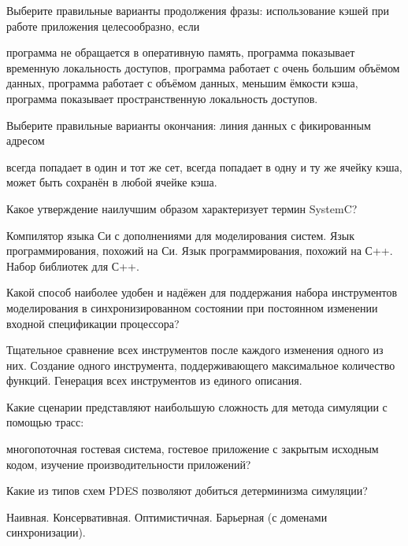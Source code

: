 \documentclass[a4paper, 12pt, addpoints, answers]{exam}
\begin{document}
\begin{questions}
\question[1] Выберите правильные варианты продолжения фразы: использование кэшей при работе приложения целесообразно, если
\begin{choices}
    \choice программа не обращается в оперативную память,
    \correctchoice    программа показывает временную локальность доступов,
    \choice программа работает с очень большим объёмом данных,
    \choice программа работает с объёмом данных, меньшим ёмкости кэша,
    \correctchoice программа показывает пространственную локальность доступов.
\end{choices}

\question[1] Выберите правильные варианты окончания: линия данных с фикированным адресом
\begin{choices}
    \correctchoice всегда попадает в один и тот же сет,
    \choice всегда попадает в одну и ту же ячейку кэша,
    \choice может быть сохранён в любой ячейке кэша.
\end{choices}

\question[1] Какое утверждение наилучшим образом характеризует термин SystemC?
\begin{choices}
    \choice Компилятор языка Си с дополнениями для моделирования систем.
    \choice Язык программирования, похожий на Си.
    \choice Язык программирования, похожий на С++.
    \correctchoice Набор библиотек для С++.
\end{choices}

\question[1] Какой способ наиболее удобен и надёжен для поддержания набора инструментов моделирования в синхронизированном состоянии при постоянном изменении входной спецификации процессора?
\begin{choices}
    \choice Тщательное сравнение всех инструментов после каждого изменения одного из них.
    \choice Создание одного инструмента, поддерживающего максимальное количество функций.
    \correctchoice Генерация всех инструментов из единого описания.
\end{choices}

\question[1] Какие сценарии представляют наибольшую сложность для метода симуляции с помощью трасс:
\begin{choices}
\correctchoice многопоточная гостевая система,
\choice гостевое приложение с закрытым исходным кодом,
\choice изучение производительности приложений?
\end{choices}

\question[1] Какие из типов схем PDES позволяют добиться детерминизма симуляции?
\begin{choices}
    \choice Наивная.
    \choice Консервативная.
    \choice Оптимистичная.
    \correctchoice Барьерная (с доменами синхронизации).
\end{choices}


\end{questions}
\end{document}
